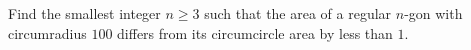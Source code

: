 Find the smallest integer $n\ge3$ such that the area of a regular $n$-gon with circumradius $100$ differs from its circumcircle area by less than $1$.
